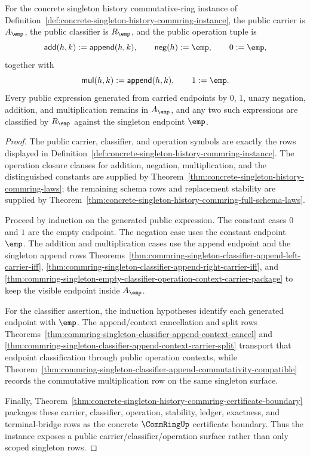 \begin{theorem}
\label{thm:commring-singleton-public-operation-surface}
For the concrete singleton history commutative-ring instance of
Definition~\ref{def:concrete-singleton-history-commring-instance}, the public
carrier is $A_{\emp}$, the public classifier is $R_{\emp}$, and the public
operation tuple is
$$
\mathsf{add}(h,k):=\mathsf{append}(h,k),\qquad
\mathsf{neg}(h):=\emp,\qquad
0:=\emp,
$$
together with
$$
\mathsf{mul}(h,k):=\mathsf{append}(h,k),\qquad
1:=\emp .
$$
Every public expression generated from carried endpoints by $0$, $1$,
unary negation, addition, and multiplication remains in $A_{\emp}$, and any
two such expressions are classified by $R_{\emp}$ against the singleton
endpoint $\emp$.
\end{theorem}
\begin{proof}
The public carrier, classifier, and operation symbols are exactly the rows
displayed in
Definition~\ref{def:concrete-singleton-history-commring-instance}. The
operation closure clauses for addition, negation, multiplication, and the
distinguished constants are supplied by
Theorem~\ref{thm:concrete-singleton-history-commring-laws}; the remaining
schema rows and replacement stability are supplied by
Theorem~\ref{thm:concrete-singleton-history-commring-full-schema-laws}.

Proceed by induction on the generated public expression. The constant cases
$0$ and $1$ are the empty endpoint. The negation case uses the constant
endpoint $\emp$. The addition and multiplication cases use the append endpoint
and the singleton append rows
Theorems~\ref{thm:commring-singleton-classifier-append-left-carrier-iff},
\ref{thm:commring-singleton-classifier-append-right-carrier-iff}, and
\ref{thm:commring-singleton-empty-classifier-operation-context-carrier-package}
to keep the visible endpoint inside $A_{\emp}$.

For the classifier assertion, the induction hypotheses identify each generated
endpoint with $\emp$. The append/context cancellation and split rows
Theorems~\ref{thm:commring-singleton-classifier-append-context-cancel} and
\ref{thm:commring-singleton-classifier-append-context-carrier-split} transport
that endpoint classification through public operation contexts, while
Theorem~\ref{thm:commring-singleton-classifier-append-commutativity-compatible}
records the commutative multiplication row on the same singleton surface.

Finally,
Theorem~\ref{thm:concrete-singleton-history-commring-certificate-boundary}
packages these carrier, classifier, operation, stability, ledger, exactness,
and terminal-bridge rows as the concrete $\CommRingUp$ certificate boundary.
Thus the instance exposes a public carrier/classifier/operation surface rather
than only scoped singleton rows.
\end{proof}

